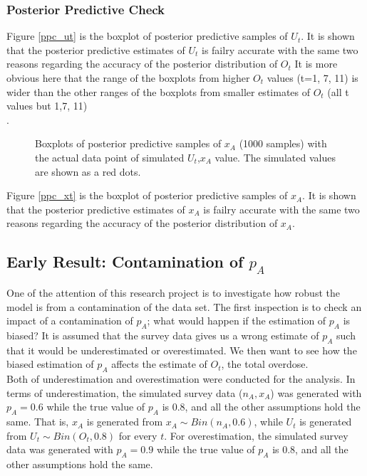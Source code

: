 \documentclass[
10pt, %
letterpaper, %
oneside, %
headinclude,footinclude, %
BCOR5mm, %
]{article}
\begin{document}
\newpage
\subsubsection{Posterior Predictive Check}


Figure \ref{ppc_ut} is the boxplot of posterior predictive samples of $U_t$. It is shown that the posterior predictive estimates of $U_t$ is failry accurate with the same two reasons regarding the accuracy of the posterior distribution of $O_t$ It is more obvious here that the range of the boxplots from  higher $O_t$ values (t=1, 7, 11) is wider than the other ranges of the boxplots from smaller estimates of $O_t$ (all t values but 1,7, 11)\\.

\begin{figure}[htb]
	\centering
	\caption[two early result box plots:]{Boxplots of posterior predictive samples of $x_A$ (1000 samples) with the actual data point of simulated $U_t$,$x_A$ value. The simulated values are shown as a red dots.}
	
\end{figure}

Figure \ref{ppc_xt} is the boxplot of posterior predictive samples of $x_A$. It is shown that the posterior predictive estimates of $x_A$ is failry accurate with the same two reasons regarding the accuracy of the posterior distribution of $x_A$.\\
 


\subsection{Early Result: Contamination of $p_A$ } 
One of the attention of this research project is to investigate how robust the model is from a contamination of the data set. The first inspection is to check an impact of a contamination of $p_A$; what would happen if the estimation of $p_A$ is biased? It is assumed that the survey data gives us a wrong estimate of $p_A$ such that it would be underestimated or overestimated. We then want to see how the biased estimation of $p_A$ affects the estimate of $O_t$, the total overdose.\\

Both of underestimation and overestimation were conducted for the analysis. In terms of underestimation, the simulated survey data ($n_A, x_A$) was generated with $p_A=0.6$ while the true value of $p_A$ is 0.8, and all the other assumptions hold the same. That is, $x_A$ is generated from $x_A \sim Bin(n_A, 0.6)$, while $U_t$ is generated from $U_t \sim Bin(O_t, 0.8)$ for every $t$. For overestimation, the simulated survey data was generated with $p_A=0.9$ while the true value of $p_A$ is 0.8, and all the other assumptions hold the same.  \\
\end{document}
